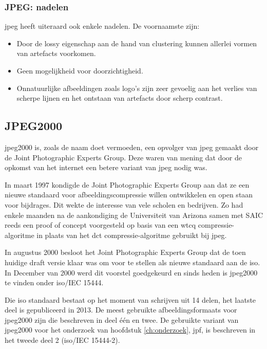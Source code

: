 \subsubsection{JPEG: nadelen}
\label{sec:afbeeldingscompressie-jpeg-nadelen}

\Gls{jpeg} heeft uiteraard ook enkele nadelen. De voornaamste zijn:

\begin{itemize}
	\item Door de \gls{lossy} eigenschap aan de hand van clustering kunnen allerlei vormen van \glspl{artefact} voorkomen.
	
	\item Geen mogelijkheid voor doorzichtigheid.
	
	\item Onnatuurlijke afbeeldingen zoals logo's zijn zeer gevoelig aan het verlies van scherpe lijnen en het ontstaan van \glspl{artefact} door scherp contrast.
\end{itemize}

\subsection{JPEG2000}
\label{sec:afbeeldingscompressie-jpeg2000}

\Gls{jpeg2000} is, zoals de naam doet vermoeden, een opvolger van \gls{jpeg} gemaakt door de Joint Photographic Experts Group. Deze waren van mening dat door de opkomst van het internet een betere variant van \gls{jpeg} nodig was.

In maart 1997 kondigde de Joint Photographic Experts Group aan dat ze een nieuwe standaard voor afbeeldingscompressie willen ontwikkelen en open staan voor bijdrages. Dit wekte de interesse van vele scholen en bedrijven. Zo had enkele maanden na de aankondiging de Universiteit van Arizona samen met SAIC reeds een proof of concept voorgesteld op basis van een \gls{wtcq} \gls{compressie-algoritme} in plaats van het \gls{dct} \gls{compressie-algoritme} gebruikt bij \gls{jpeg}.

In augustus 2000 besloot het Joint Photographic Experts Group dat de toen huidige draft versie klaar was om voor te stellen als nieuwe standaard aan de \gls{iso}. In December van 2000 werd dit voorstel goedgekeurd en sinds heden is  \gls{jpeg2000} te vinden onder \gls{iso}/IEC 15444. 

Die \gls{iso} standaard bestaat op het moment van schrijven uit 14 delen, het laatste deel is gepubliceerd in 2013. De meest gebruikte \glspl{afbeeldingsformaat} voor \gls{jpeg2000} zijn die beschreven in deel één en twee. De gebruikte variant van \gls{jpeg2000} voor het onderzoek van hoofdstuk \ref{ch:onderzoek}, \gls{jpf}, is beschreven in het tweede deel 2 (\gls{iso}/IEC 15444-2).

